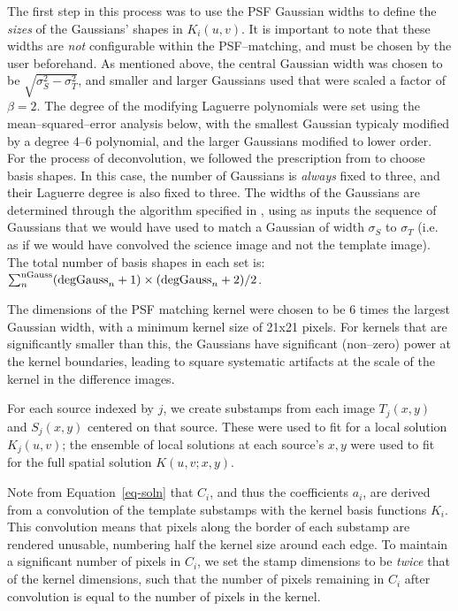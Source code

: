\documentclass[floatfix, apj]{emulateapj}
\begin{document}
The first step in this process was to use the PSF Gaussian widths to define the {\it sizes} of the Gaussians' shapes in $K_i(u,v)$.
It is important to note that these widths are {\it not} configurable within the PSF--matching, and must be chosen by the user beforehand.
As mentioned above, the central Gaussian width was chosen to be $\sqrt{\sigma_S^2 - \sigma_T^2}$, and smaller and larger Gaussians used that were scaled a factor of $\beta = 2$.
The degree of the modifying Laguerre polynomials were set using the mean--squared--error analysis below, with the smallest Gaussian typicaly modified by a degree 4--6 polynomial, and the larger Gaussians modified to lower order.
For the process of deconvolution, we followed the prescription from \cite{0266-5611-26-8-085002} to choose basis shapes.
In this case, the number of Gaussians is {\it always} fixed to three, and their Laguerre degree is also fixed to three.
The widths of the Gaussians are determined through the algorithm specified in \cite{0266-5611-26-8-085002}, using as inputs the sequence of Gaussians that we would have used to match a Gaussian of width $\sigma_S$ to $\sigma_T$ (i.e. as if we would have convolved the science image and not the template image).
The total number of basis shapes in each set is: $\sum_n^{\rm nGauss} ({\rm degGauss}_n+1)\times({\rm degGauss}_n+2)/2$.

The dimensions of the PSF matching kernel were chosen to be 6 times the largest Gaussian width, with a minimum kernel size of 21x21 pixels.
For kernels that are significantly smaller than this, the Gaussians have significant (non--zero) power at the kernel boundaries, leading to square systematic artifacts at the scale of the kernel in the difference images.

For each source indexed by $j$, we create substamps from each image $T_j(x,y)$ and $S_j(x,y)$ centered on that source.
These were used to fit for a local solution $K_j(u,v)$; the ensemble of local solutions at each source's $x,y$ were used to fit for the full spatial solution $K(u,v;x,y)$.

Note from Equation~\ref{eq-soln} that $C_i$, and thus the coefficients $a_i$, are derived from a convolution of the template substamps with the kernel basis functions $K_i$.
This convolution means that pixels along the border of each substamp are rendered unusable, numbering half the kernel size around each edge.
To maintain a significant number of pixels in $C_i$, we set the stamp dimensions to be {\it twice} that of the kernel dimensions, such that the number of pixels remaining in $C_i$ after convolution is equal to the number of pixels in the kernel.
\end{document}
